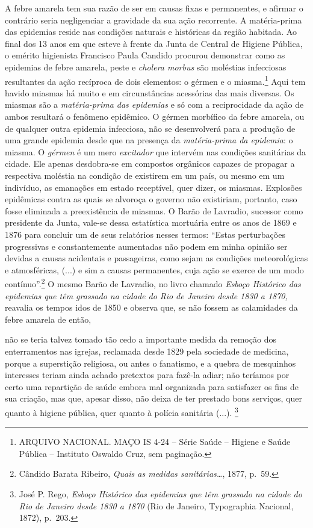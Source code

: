 A febre amarela tem sua razão de ser em causas fixas e permanentes, e
afirmar o contrário seria negligenciar a gravidade da sua ação
recorrente. A matéria-prima das epidemias reside nas condições naturais
e históricas da região habitada. Ao final dos 13 anos em que esteve à
frente da Junta de Central de Higiene Pública, o emérito higienista
Francisco Paula Candido procurou demonstrar como as epidemias de febre
amarela, peste e \emph{cholera morbus} são moléstias infecciosas
resultantes da ação recíproca de dois elementos: o gérmen e o
miasma.\footnote{ARQUIVO NACIONAL. MAÇO IS 4-24 -- Série Saúde --
  Higiene e Saúde Pública -- Instituto Oswaldo Cruz, sem paginação.}
Aqui tem havido miasmas há muito e em circunstâncias acessórias das mais
diversas. Os miasmas são a \emph{matéria-prima das epidemias} e só com a
reciprocidade da ação de ambos resultará o fenômeno epidêmico. O gérmen
morbífico da febre amarela, ou de qualquer outra epidemia infecciosa,
não se desenvolverá para a produção de uma grande epidemia desde que na
presença da \emph{matéria-prima da epidemia}: o miasma. O \emph{gérmen}
é um mero \emph{excitador} que intervém nas condições sanitárias da
cidade. Ele apenas desdobra-se em compostos orgânicos capazes de
propagar a respectiva moléstia na condição de existirem em um país, ou
mesmo em um indivíduo, as emanações em estado receptível, quer dizer, os
miasmas. Explosões epidêmicas contra as quais se alvoroça o governo não
existiriam, portanto, caso fosse eliminada a preexistência de miasmas. O
Barão de Lavradio, sucessor como presidente da Junta, vale-se dessa
estatística mortuária entre os anos de 1869 e 1876 para concluir um de
seus relatórios nesses termos: ``Estas perturbações progressivas e
constantemente aumentadas não podem em minha opinião ser devidas a
causas acidentais e passageiras, como sejam as condições meteorológicas
e atmosféricas, (...) e sim a causas permanentes, cuja ação se exerce de
um modo contínuo''.\footnote{Cândido Barata Ribeiro, \emph{Quais as
  medidas sanitárias\ldots{}}, 1877, p.~59.} O mesmo Barão de Lavradio,
no livro chamado \emph{Esboço Histórico das epidemias que têm grassado
na cidade do Rio de Janeiro desde 1830 a 1870,} reavalia os tempos idos
de 1850 e observa que, se não fossem as calamidades da febre amarela de
então,

não se teria talvez tomado tão cedo a importante medida da remoção dos
enterramentos nas igrejas, reclamada desde 1829 pela sociedade de
medicina, porque a superstição religiosa, ou antes o fanatismo, e a
quebra de mesquinhos interesses teriam ainda achado pretextos para
fazê-la adiar; não teríamos por certo uma repartição de saúde embora mal
organizada para satisfazer os fins de sua criação, mas que, apesar
disso, não deixa de ter prestado bons serviços, quer quanto à higiene
pública, quer quanto à polícia sanitária (...). \footnote{José P. Rego,
  \emph{Esboço Histórico das epidemias que têm grassado na cidade do Rio
  de Janeiro desde 1830 a 1870} (Rio de Janeiro, Typographia Nacional,
  1872), p.~203.}


